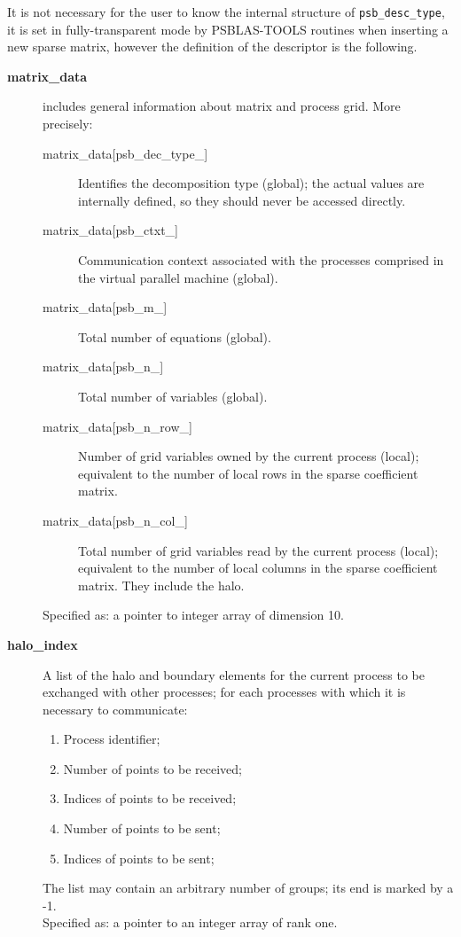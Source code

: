 It is not necessary for the user to
know the internal structure of \verb|psb_desc_type|, it is set in
fully-transparent mode by PSBLAS-TOOLS routines when inserting a new
sparse matrix, however the definition of the descriptor is the
following.  
\begin{description}
\item[{\bf matrix\_data}] includes general information about matrix and
process grid. More precisely:
\begin{description}
\item[matrix\_data[psb\_dec\_type\_\hbox{]}] Identifies the decomposition type
(global); the actual values are internally defined, so they should
never be accessed directly.
\item[matrix\_data[psb\_ctxt\_\hbox{]}] Communication context
  associated with the processes comprised in the virtual parallel
  machine (global).
\item[matrix\_data[psb\_m\_\hbox{]}] Total number of equations (global).
\item[matrix\_data[psb\_n\_\hbox{]}] Total number of variables (global).
\item[matrix\_data[psb\_n\_row\_\hbox{]}] Number of grid variables owned by the
current process (local); equivalent to the number of local rows in the
sparse coefficient matrix.
\item[matrix\_data[psb\_n\_col\_\hbox{]}] Total number of grid variables read by the
current process (local); equivalent to the number of local columns in
the sparse coefficient matrix. They include the halo.
\end{description}
Specified as: a pointer to integer array of dimension 10.
\item[{\bf halo\_index}] A list of the halo and boundary elements for
the current process to be exchanged with other processes; for each
processes with which it is necessary to communicate:
\begin{enumerate}
\item Process identifier;
\item Number of points to be received;
\item Indices of points to be received;
\item Number of points to be sent;
\item Indices of points to be sent;
\end{enumerate}
The list may contain an arbitrary number of groups; its end is marked
by a -1.\\
Specified as: a pointer to an integer array of rank one.

\end{description}
